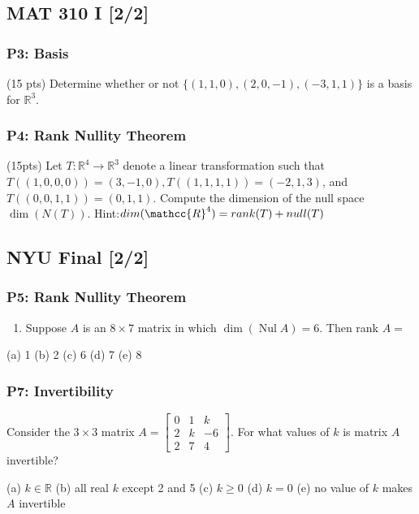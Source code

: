 \documentclass[11pt]{article}
\begin{document}
\subsection{MAT 310 I [2/2]}
\label{sec:orgde6d6f2}
\subsubsection{P3: Basis}
\label{sec:org6fce0ee}
(15 pts) Determine whether or not \(\{(1,1,0),(2,0,-1),(-3,1,1)\}\) is a basis
for \(\mathbb{R}^{3}\).
\subsubsection{P4: Rank Nullity Theorem}
\label{sec:org1c611fd}
(15pts) Let \(T: \mathbb{R}^{4} \rightarrow \mathbb{R}^{3}\) denote a linear
transformation such that \(T((1,0,0,0))= (3,-1,0), T((1,1,1,1))=(-2,1,3)\), and
\(T((0,0,1,1))=(0,1,1)\). Compute the dimension of the null space
\(\operatorname{dim}(N(T))\). Hint:\(dim(\mathcc{R}^{4}) = rank(T) + null(T)\)
\subsection{NYU Final [2/2]}
\label{sec:orgc79c6e9}
\subsubsection{P5: Rank Nullity Theorem}
\label{sec:org8105027}
\begin{enumerate}
\item Suppose \(A\) is an \(8 \times 7\) matrix in which \(\operatorname{dim}(\operatorname{Nul} A)=6\). Then rank \(A=\)
\end{enumerate}
(a) 1
(b) 2
(c) 6
(d) 7
(e) 8
\subsubsection{P7: Invertibility}
\label{sec:orgc18fbbe}
Consider the \(3 \times 3\) matrix \(A=\left[\begin{array}{rrr}0 & 1 & k \\ 2 & k
 & -6 \\ 2 & 7 & 4\end{array}\right]\). For what values of \(k\) is matrix \(A\)
invertible?

(a) \(k \in \mathbb{R}\)
(b) all real \(k\) except 2 and 5
(c) \(k \geq 0\)
(d) \(k=0\)
(e) no value of \(k\) makes \(A\) invertible
\end{document}
